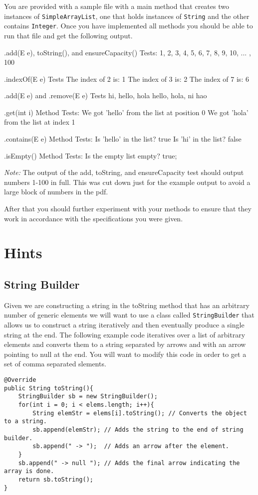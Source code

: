 \documentclass[a4paper]{article}
\begin{document}
You are provided with a sample file with a main method that creates two
instances of \lstinline|SimpleArrayList|, one that holds instances of
\lstinline|String| and the other contains \lstinline|Integer|. Once you have
implemented all methods you should be able to run that file and get the following
output.


\begin{shell}
.add(E e), toString(), and ensureCapacity() Tests:
1, 2, 3, 4, 5, 6, 7, 8, 9, 10, ... , 100

.indexOf(E e) Tests
The index of 2 is: 1
The index of 3 is: 2
The index of 7 is: 6

.add(E e) and .remove(E e) Tests
hi, hello, hola
hello, hola, ni hao

.get(int i) Method Tests:
We got 'hello' from the list at position 0
We got 'hola' from the list at index 1

.contains(E e) Method Tests:
Is 'hello' in the list? true
Is 'hi' in the list? false

.isEmpty() Method Tests:
Is the empty list empty? true;
\end{shell}
\textit{Note:} The output of the add, toString, and ensureCapacity test should 
output numbers 1-100 in full. This was cut down just for the example output to
avoid a large block of numbers in the pdf.

After that you should further experiment with your methods to ensure that they
work in accordance with the specifications you were given.

\section*{Hints}

\subsection*{String Builder}

Given we are constructing a string in the toString method that has an
arbitrary number of generic elements we will want to use a class called
\lstinline|StringBuilder| that allows us to construct a string iteratively and
then eventually produce a single string at the end.  The following example code
iteratives over a list of arbitrary elements and converts them to a string
separated by arrows and with an arrow pointing to null at the end. You 
will want to modify this code in order to get a set of comma separated 
slements.
\begin{lstlisting}[frame=trBL, basicstyle=\small]
@Override 
public String toString(){
    StringBuilder sb = new StringBuilder();
    for(int i = 0; i < elems.length; i++){
        String elemStr = elems[i].toString(); // Converts the object to a string.
        sb.append(elemStr); // Adds the string to the end of string builder.
        sb.append(" -> ");  // Adds an arrow after the element.
    }
    sb.append(" -> null "); // Adds the final arrow indicating the array is done.
    return sb.toString();
}
\end{lstlisting}
\end{document}
